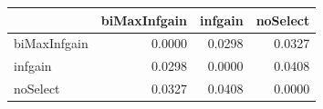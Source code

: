 \begin{tabular}{lrrr}
\toprule
 & biMaxInfgain & infgain & noSelect \\
\midrule
biMaxInfgain & 0.0000 & 0.0298 & 0.0327 \\
infgain & 0.0298 & 0.0000 & 0.0408 \\
noSelect & 0.0327 & 0.0408 & 0.0000 \\
\bottomrule
\end{tabular}
